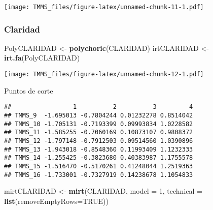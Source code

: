 \documentclass[
  10pt,
  spanish,
]{article}
\newenvironment{Shaded}{\begin{snugshade}}{\end{snugshade}}
\newcommand{\DataTypeTok}[1]{\textcolor[rgb]{0.13,0.29,0.53}{#1}}
\newcommand{\DecValTok}[1]{\textcolor[rgb]{0.00,0.00,0.81}{#1}}
\newcommand{\KeywordTok}[1]{\textcolor[rgb]{0.13,0.29,0.53}{\textbf{#1}}}
\newcommand{\NormalTok}[1]{#1}
\newcommand{\OperatorTok}[1]{\textcolor[rgb]{0.81,0.36,0.00}{\textbf{#1}}}
\newcommand{\OtherTok}[1]{\textcolor[rgb]{0.56,0.35,0.01}{#1}}
\newcommand{\StringTok}[1]{\textcolor[rgb]{0.31,0.60,0.02}{#1}}
\begin{document}
\texttt{[image: TMMS\_files/figure-latex/unnamed-chunk-11-1.pdf]}

\hypertarget{claridad-1}{%
\subsubsection{Claridad}\label{claridad-1}}

\begin{Shaded}
\begin{Highlighting}[]
\NormalTok{PolyCLARIDAD <-}\StringTok{ }\KeywordTok{polychoric}\NormalTok{(CLARIDAD)}
\NormalTok{irtCLARIDAD <-}\StringTok{ }\KeywordTok{irt.fa}\NormalTok{(PolyCLARIDAD)}
\end{Highlighting}
\end{Shaded}

\texttt{[image: TMMS\_files/figure-latex/unnamed-chunk-12-1.pdf]}

Puntos de corte

\begin{Shaded}
\end{Shaded}

\begin{verbatim}
##                 1          2          3         4
## TMMS_9  -1.695013 -0.7804244 0.01232278 0.8514042
## TMMS_10 -1.705131 -0.7193399 0.09993834 1.0228582
## TMMS_11 -1.585255 -0.7060169 0.10873107 0.9808372
## TMMS_12 -1.797148 -0.7912503 0.09514560 1.0390896
## TMMS_13 -1.943018 -0.8548360 0.11993409 1.1232333
## TMMS_14 -1.255425 -0.3823680 0.40383987 1.1755578
## TMMS_15 -1.516470 -0.5170261 0.41248044 1.2519363
## TMMS_16 -1.733001 -0.7327919 0.14238678 1.1054833
\end{verbatim}

\begin{Shaded}
\begin{Highlighting}[]
\NormalTok{mirtCLARIDAD <-}\StringTok{ }\KeywordTok{mirt}\NormalTok{(CLARIDAD, }\DataTypeTok{model =} \DecValTok{1}\NormalTok{, }\DataTypeTok{technical =} \KeywordTok{list}\NormalTok{(}\DataTypeTok{removeEmptyRows=}\OtherTok{TRUE}\NormalTok{)) }
\end{Highlighting}
\end{Shaded}
\end{document}
